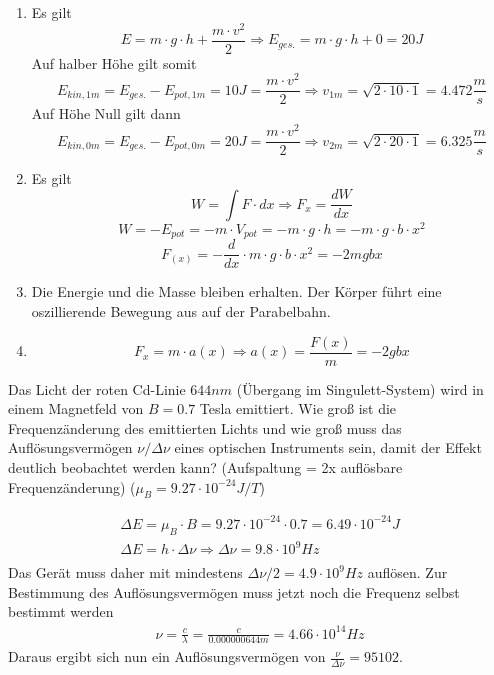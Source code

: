 \documentclass[12pt,a4paper,ngerman]{article}
\begin{document}
\begin{enumerate}
\item Es gilt
\begin{equation*}
E = m \cdot g \cdot h + \frac{m \cdot v^2}{2} \Rightarrow E_{ges.} = m \cdot g \cdot h + 0 = 20 J
\end{equation*}
Auf halber Höhe gilt somit
\begin{equation*}
E_{kin,1m} = E_{ges.}-E_{pot,1m} = 10J = \frac{m \cdot v^2}{2} \Rightarrow v_{1m} =\sqrt{2 \cdot 10 \cdot 1}  = 4.472 \frac{m}{s}
\end{equation*}
Auf Höhe Null gilt dann
\begin{equation*}
E_{kin,0m} = E_{ges.}-E_{pot,0m} = 20J = \frac{m \cdot v^2}{2} \Rightarrow v_{2m} =\sqrt{2 \cdot 20 \cdot 1}  = 6.325 \frac{m}{s}
\end{equation*}
\item Es gilt
\begin{equation*}
W = \int{F \cdot dx} \Rightarrow F_x = \frac{dW}{dx}
\end{equation*}
\begin{equation*}
W = -E_{pot} = -m \cdot V_{pot} = -m\cdot g\cdot h = -m \cdot g \cdot b \cdot x^2
\end{equation*}
\begin{equation*}
F_{(x)} = -\frac{d}{dx}\cdot m \cdot g \cdot b\cdot x^2 = -2mgbx
\end{equation*}
\item Die Energie und die Masse bleiben erhalten. Der Körper führt eine oszillierende Bewegung aus auf der Parabelbahn. 
\item \begin{equation}
F_{x} = m \cdot a(x) \Rightarrow a(x) = \frac{F(x)}{m} = -2gbx
\end{equation}
\end{enumerate}

\pagebreak

\begin{framed}
Das Licht der roten Cd-Linie $644nm$ (Übergang im Singulett-System) wird in einem Magnetfeld von $B = 0.7$ Tesla emittiert. Wie groß ist die Frequenzänderung des emittierten Lichts und wie groß muss das Auflösungsvermögen $\nu /\Delta \nu$ eines optischen Instruments sein, damit der Effekt deutlich beobachtet werden kann? (Aufspaltung = 2x auflösbare Frequenzänderung) ($\mu_B = 9.27 \cdot 10^{-24}J/T$)
\end{framed}

\begin{align*}
\Delta E = \mu_B \cdot B = 9.27 \cdot 10^{-24} \cdot 0.7 = 6.49 \cdot 10^{-24} J \\
\Delta E = h \cdot \Delta \nu \Rightarrow \Delta \nu = 9.8 \cdot 10^9 Hz \\
\end{align*}
Das Gerät muss daher mit mindestens $\Delta \nu /2 = 4.9 \cdot 10^9 Hz$ auflösen. Zur Bestimmung des Auflösungsvermögen muss jetzt noch die Frequenz selbst bestimmt werden
\begin{align*}
\nu = \frac{c}{\lambda} = \frac{c}{0.000000644m} = 4.66 \cdot 10^{14}Hz
\end{align*}
Daraus ergibt sich nun ein Auflösungsvermögen von $\frac{\nu}{\Delta \nu} = 95102$. 
\end{document}
